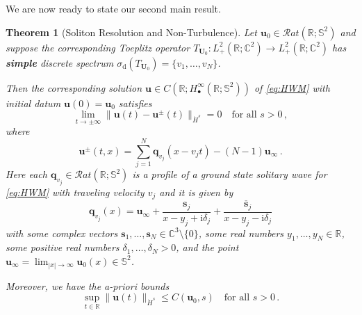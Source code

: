 \documentclass[11pt,reqno]{amsart}
\newtheorem{thm}{Theorem}[section]
\theoremstyle{definition}
\theoremstyle{remark}
\theoremstyle{remark}
\numberwithin{equation}{section}
\newcommand{\C}{\mathbb{C}}
\newcommand{\R}{\mathbb{R}}
\newcommand{\Ss}{\mathbb{S}}
\newcommand{\ov}{\overline}
\newcommand{\sv}{\mathbf{s}}
\newcommand{\qv}{\mathbf{q}}
\newcommand{\ii}{\mathrm{i}}
\newcommand{\uu}{\mathbf{u}}
\newcommand{\Ub}{\mathbf{U}}
\begin{document}
We are now ready to state our second main result.

\begin{thm}[Soliton Resolution and Non-Turbulence] \label{thm:soliton_S2}
Let $\uu_0 \in \mathcal{R}at(\R; \Ss^2)$ and suppose the corresponding Toeplitz operator $T_{\Ub_0}  : L^2_+(\R; \C^2) \to L_+^2(\R; \C^2)$ has \textbf{simple} discrete spectrum $\sigma_{\mathrm{d}}(T_{\Ub_0})=\{ v_1, \ldots, v_N \}$. 

Then the corresponding solution $\uu \in C(\R; H^\infty_\bullet(\R; \Ss^2))$ of \eqref{eq:HWM} with initial datum $\uu(0) = \uu_0$ satisfies
$$
\lim_{t \to \pm \infty} \| \uu(t) - \uu^\pm(t) \|_{\dot{H}^s} = 0 \quad \mbox{for all $s > 0$} \, ,
$$
where
$$
\uu^{\pm}(t,x) = \sum_{j=1}^N \qv_{v_j}(x-v_jt) - (N-1) \uu_\infty \, .
$$
Here each $\qv_{v_j} \in \mathcal{R}at(\R; \Ss^2)$ is a profile of a ground state solitary wave for \eqref{eq:HWM} with traveling velocity $v_j$ and it is given by
$$
\qv_{v_j}(x) = \uu_\infty + \frac{\sv_j}{x-y_j+\ii \delta_j} + \frac{\ov{\sv}_j}{x-y_j-\ii \delta_j}
$$
with some complex vectors $\sv_{1}, \ldots, \sv_N \in \C^3 \setminus \{ 0 \}$, some real numbers $y_1, \ldots, y_N \in \R$, some positive real numbers $\delta_1, \ldots, \delta_N  > 0$, and the point $\uu_\infty = \lim_{|x| \to \infty} \uu_0(x) \in \Ss^2$. 

Moreover, we have the a-priori bounds
$$
\sup_{t \in \R} \| \uu(t) \|_{\dot{H}^s} \leq C(\uu_0,s) \quad \mbox{for all $s >0$} \, .
$$ 
\end{thm}
\end{document}
